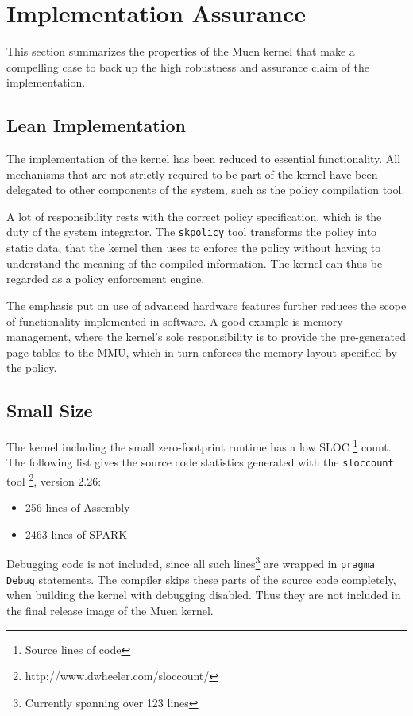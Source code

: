 \section{Implementation Assurance}\label{sec:impl-assurance}
This section summarizes the properties of the Muen kernel that make a compelling
case to back up the high robustness and assurance claim of the implementation.

\subsection{Lean Implementation}
The implementation of the kernel has been reduced to essential functionality.
All mechanisms that are not strictly required to be part of the kernel have been
delegated to other components of the system, such as the policy compilation
tool.

A lot of responsibility rests with the correct policy specification, which is
the duty of the system integrator. The \texttt{skpolicy} tool transforms the
policy into static data, that the kernel then uses to enforce the policy without
having to understand the meaning of the compiled information. The kernel can
thus be regarded as a policy enforcement engine.

The emphasis put on use of advanced hardware features further reduces the scope
of functionality implemented in software. A good example is memory management,
where the kernel's sole responsibility is to provide the pre-generated page
tables to the MMU, which in turn enforces the memory layout specified by the
policy.

\subsection{Small Size}
The kernel including the small zero-footprint runtime has a low SLOC
\footnote{Source lines of code} count. The following list gives the source code
statistics generated with the \texttt{sloccount} tool
\footnote{http://www.dwheeler.com/sloccount/}, version 2.26:

\begin{itemize}
	\item 256 lines of Assembly
	\item 2463 lines of SPARK
\end{itemize}

Debugging code is not included, since all such lines\footnote{Currently spanning
over 123 lines} are wrapped in \texttt{pragma Debug} statements. The compiler
skips these parts of the source code completely, when building the kernel with
debugging disabled. Thus they are not included in the final release image of the
Muen kernel.


